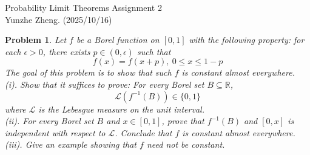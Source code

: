 \documentclass[12pt]{article}
\newtheorem{problem}{Problem}
\begin{document}
\noindent Probability Limit Theorems \hfill Assignment 2\\
Yunzhe Zheng. (2025/10/16)

\hrulefill

\begin{problem}
    Let $f$ be a Borel function on $[0,1]$ with the following property: for each $\epsilon>0$, there exists $p\in(0,\epsilon)$ such that 
    $$
        f(x)=f(x+p), \ 0\leq x\leq 1-p
    $$
    The goal of this problem is to show that such $f$ is constant almost everywhere. \\
    \indent (i). Show that it suffices to prove: For every Borel set $B\subseteq\mathbb{R}$, 
    $$
        \mathcal{L}(f^{-1}(B))\in\{0,1\}
    $$
    where $\mathcal{L}$ is the Lebesgue measure on the unit interval. \\
    \indent (ii). For every Borel set $B$ and $x\in[0,1]$, prove that $f^{-1}(B)$ and $[0,x]$ is independent with respect to $\mathcal{L}$. Conclude that $f$ is constant almost everywhere. \\
    \indent (iii). Give an example showing that $f$ need not be constant.
\end{problem}
\end{document}
